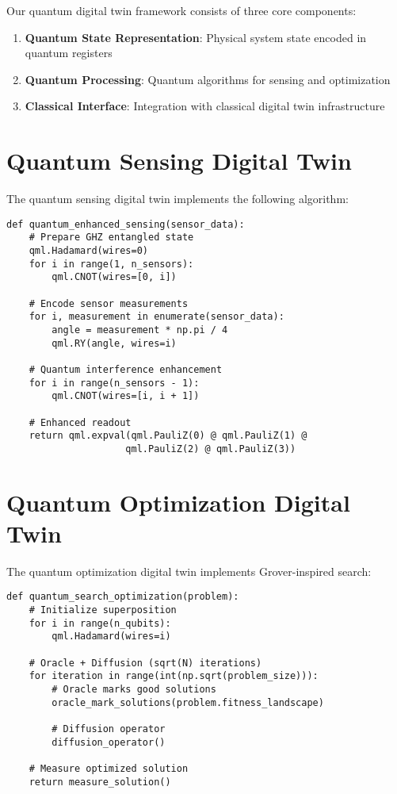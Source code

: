 \documentclass[12pt,a4paper]{report}
\begin{document}
Our quantum digital twin framework consists of three core components:

\begin{enumerate}
\item \textbf{Quantum State Representation}: Physical system state encoded in quantum registers
\item \textbf{Quantum Processing}: Quantum algorithms for sensing and optimization
\item \textbf{Classical Interface}: Integration with classical digital twin infrastructure
\end{enumerate}

\section{Quantum Sensing Digital Twin}

The quantum sensing digital twin implements the following algorithm:

\begin{lstlisting}[caption=Quantum Sensing Implementation]
def quantum_enhanced_sensing(sensor_data):
    # Prepare GHZ entangled state
    qml.Hadamard(wires=0)
    for i in range(1, n_sensors):
        qml.CNOT(wires=[0, i])

    # Encode sensor measurements
    for i, measurement in enumerate(sensor_data):
        angle = measurement * np.pi / 4
        qml.RY(angle, wires=i)

    # Quantum interference enhancement
    for i in range(n_sensors - 1):
        qml.CNOT(wires=[i, i + 1])

    # Enhanced readout
    return qml.expval(qml.PauliZ(0) @ qml.PauliZ(1) @
                     qml.PauliZ(2) @ qml.PauliZ(3))
\end{lstlisting}

\section{Quantum Optimization Digital Twin}

The quantum optimization digital twin implements Grover-inspired search:

\begin{lstlisting}[caption=Quantum Optimization Implementation]
def quantum_search_optimization(problem):
    # Initialize superposition
    for i in range(n_qubits):
        qml.Hadamard(wires=i)

    # Oracle + Diffusion (sqrt(N) iterations)
    for iteration in range(int(np.sqrt(problem_size))):
        # Oracle marks good solutions
        oracle_mark_solutions(problem.fitness_landscape)

        # Diffusion operator
        diffusion_operator()

    # Measure optimized solution
    return measure_solution()
\end{lstlisting}
\end{document}
